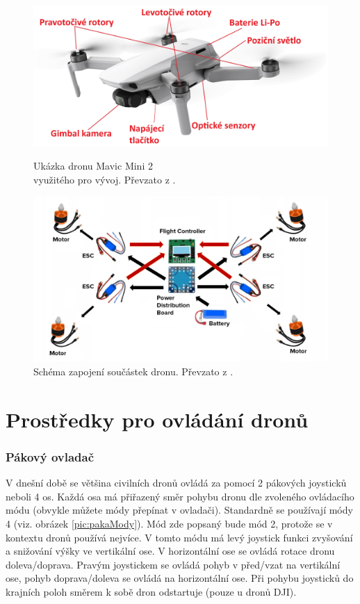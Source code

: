 \begin{figure}[h]
  \begin{minipage}{0.5\textwidth}
    \centering
    \includegraphics[width=\textwidth]{obrazky-figures/drony/djiMavicMiniPopis.jpg}
    \caption{Ukázka dronu Mavic Mini 2 \\využitého pro vývoj. Převzato z \cite{mavici2pic}.}
    \label{pic:mavicMini}
  \end{minipage}
  \begin{minipage}{0.45\textwidth}
    \centering
    \includegraphics[width=\textwidth]{obrazky-figures/drony/DroneIntenals.png}
    \caption{Schéma zapojení součástek dronu. Převzato z \cite{droneIntrnals}.}
    \label{fig:dronSchema}
  \end{minipage}
\end{figure}

\section{Prostředky pro ovládání dronů} \label{sec:ovladace}
\subsubsection{Pákový ovladač}
V dnešní době se většina civilních dronů ovládá za pomocí 2 pákových joysticků neboli 4 os. Každá osa má přiřazený směr pohybu dronu dle zvoleného ovládacího módu (obvykle můžete módy přepínat v ovladači). Standardně se používají módy 4 (viz. obrázek \ref{pic:pakaMody}). Mód zde popsaný bude mód 2, protože se v kontextu dronů používá nejvíce. V tomto módu má levý joystick funkci zvyšování a snižování výšky ve vertikální ose. V horizontální ose se ovládá rotace dronu doleva/doprava. Pravým joystickem se ovládá pohyb v před/vzat na vertikální ose, pohyb doprava/doleva se ovládá na horizontální ose. Při pohybu joysticků do krajních poloh směrem k sobě dron odstartuje (pouze u dronů DJI).

